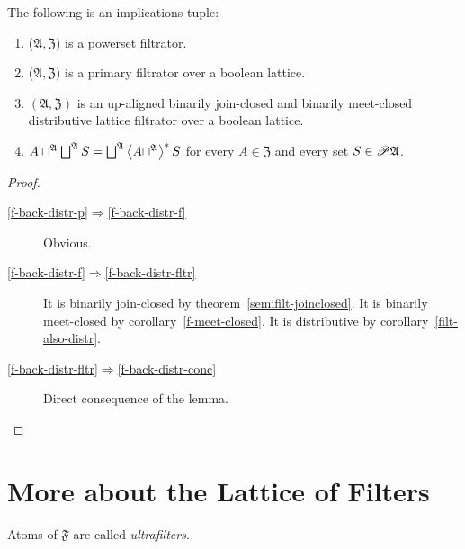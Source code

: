 \begin{thm}
\label{b-f-back-distr}The following is an implications tuple:
\begin{enumerate}
\item \label{f-back-distr-p}($\mathfrak{A},\mathfrak{Z})$ is a powerset filtrator.
\item \label{f-back-distr-f}($\mathfrak{A},\mathfrak{Z})$ is a primary filtrator over
a boolean lattice.
\item \label{f-back-distr-fltr}$(\mathfrak{A},\mathfrak{Z})$ is an up-aligned
binarily join-closed and binarily meet-closed distributive lattice
filtrator over a boolean lattice.
\item \label{f-back-distr-conc}$A\sqcap^{\mathfrak{A}}\bigsqcup^{\mathfrak{A}}S=\bigsqcup^{\mathfrak{A}}\rsupfun{A\sqcap^{\mathfrak{A}}}S$
for every $A\in\mathfrak{Z}$ and every set $S\in\mathscr{P}\mathfrak{A}$.
\end{enumerate}
\end{thm}
\begin{proof}
~
\begin{description}
\item [{\ref{f-back-distr-p}$\Rightarrow$\ref{f-back-distr-f}}] Obvious.
\item [{\ref{f-back-distr-f}$\Rightarrow$\ref{f-back-distr-fltr}}] It is binarily join-closed by theorem~\ref{semifilt-joinclosed}.
It is binarily meet-closed by corollary~\ref{f-meet-closed}. It is distributive by
corollary~\ref{filt-also-distr}.
\item [{\ref{f-back-distr-fltr}$\Rightarrow$\ref{f-back-distr-conc}}] Direct
consequence of the lemma.
\end{description}
\end{proof}

\section{More about the Lattice of Filters}
\begin{defn}
Atoms of $\mathfrak{F}$ are called \emph{ultrafilters}.
\end{defn}

